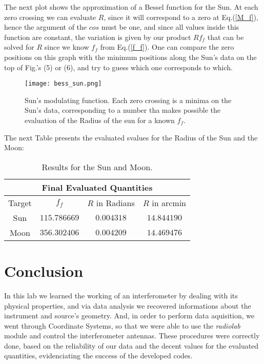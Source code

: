 \documentclass{article}
\begin{document}
The next plot shows the approximation of a Bessel function for the
Sun. At each zero crossing we can evaluate $R$, since it will correspond
to a zero at Eq.(\ref{M_f}), hence the argument of the $cos$ must be
one, and since all values inside this function are constant, the
variation is given by our product $Rf_{f}$ that can be solved for $R$
since we know $f_{f}$ from Eq.(\ref{f_f}). One can compare the zero
positions on this graph with the minimum positions along the Sun's data on
the top of Fig.'s (5) or (6), and try to guess which one corresponds to which.

\begin{figure}[H]
\center
\texttt{[image: bess\_sun.png]}
\caption {Sun's modulating function. Each zero crossing is a minima on
  the Sun's data, corresponding to a number tha makes possible the
  evaluation of the Radius of the sun for a known $f_{f}$.} 
\label{Fig:3}
\end{figure}

The next Table presents the evaluated svalues for the Radius of the Sun and the Moon:

\begin{table}[H]
\center
\begin{tabular}{|c|c|c|c|}
\hline
\multicolumn{4}{|c|}{Final Evaluated Quantities}\\
\hline
Target    & $f_{f}$ & $R$ in Radians & $R$ in arcmin \\ 
\hline
Sun & $115.786669$ & $0.004318$ &  $14.844190$\\ 
Moon & $356.302406$  & $0.004209$ & $14.469476$ \\
\hline
\end{tabular}
\caption{Results for the Sun and Moon.} 
\label{tab:1}
\end{table}

\section{Conclusion}

In this lab we learned the working of an interferometer by dealing with
its physical properties, and via data analysis we recovered informations
about the instrument and source's geometry. And, in order to perform
data aquisition, we went through Coordinate Systems, so that we were
able to use the \emph{radiolab} module and control the interferometer
antennas. These procedures were correctly done, based on the reliability
of our data and the decent values for the evaluated quantities,
evidenciating the success of the developed codes.
\end{document}

